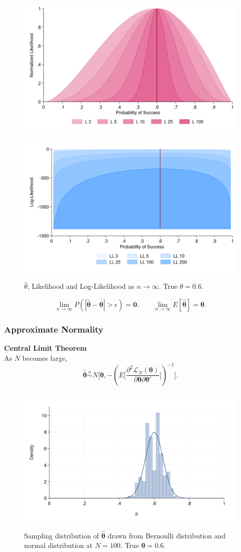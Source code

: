 \documentclass[a4paper,12pt]{article}
\begin{document}
\begin{figure}[H]
	\centering
{		\includegraphics[width=.49\textwidth]{figures/l}}\
{		\includegraphics[width=.49\textwidth]{figures/ll}}
	\caption{$\hat{\theta}$, Likelihood and Log-Likelihood as $n\rightarrow\infty$. True $\theta=0.6$.
	}
\end{figure}	
	
$$\lim_{n\rightarrow\infty}P(|\hat{\boldsymbol{\theta}}-\boldsymbol{\theta}|>\epsilon)=\boldsymbol{0}.  \quad\quad
\lim_{n\rightarrow\infty}E[\hat{\boldsymbol{\theta}}]=\boldsymbol{\theta}.$$
	


\subsubsection*{Approximate Normality}
\textbf{Central Limit Theorem}\\
As $N$ becomes large,
$$\hat{\boldsymbol{\theta}}\overset{\text{a}}{\sim} N\bigg[\boldsymbol{\theta}, -\left(E\bigg[\frac{\partial^2 \mathcal{L}_N(\boldsymbol{\theta})}{\partial\boldsymbol{\theta}\partial\boldsymbol{\theta}'}\bigg]\right)^{-1}\bigg].$$
	
	
\begin{figure}[H]
	\centering
{		\includegraphics[width=.9\textwidth]{figures/distribution_p_100}}
	\caption{Sampling distribution of $\hat{\boldsymbol{\theta}}$ drawn from Bernoulli distribution and normal distribution at $N=100$. True $\boldsymbol{\theta}=0.6$.
	}
\end{figure}	
	
\end{document}
